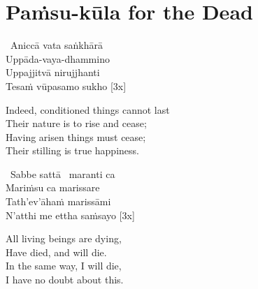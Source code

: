 \suttaRef{[Khp 7]}



\section{Paṁsu-kūla for the Dead}
\label{pamsu-kula-dead}

\begin{pali-hangtogether}
  \anglebracketleft\ \hspace{-0.5mm}Aniccā vata saṅkhārā \hspace{-0.5mm}\anglebracketright\ \\
  Uppāda-vaya-dhammino\\
  Uppajjitvā nirujjhanti\\
  Tesaṁ vūpasamo sukho \hfill{[3x]}
\end{pali-hangtogether}

\begin{english-verses}
  Indeed, conditioned things cannot last\\
  Their nature is to rise and cease;\makeatletter\hyperlink{endnote132-appendix}\makeatother\\
  Having arisen things must cease;\\
  Their stilling is true happiness.
\end{english-verses}

\suttaRef{[DN 16]}


\begin{pali-hang-continued}
  \anglebracketleft\ \hspace{-0.5mm}Sabbe sattā \hspace{-0.5mm}\anglebracketright\ maranti ca\\
  Mariṁsu ca marissare\\
  Tath'ev'āhaṁ marissāmi\\
  N'atthi me ettha saṁsayo \hfill{[3x]}
\end{pali-hang-continued}

\begin{english-verses}
  All living beings are dying,\\
  Have died, and will die.\\
  In the same way, I will die,\\
  I have no doubt about this.
\end{english-verses}

